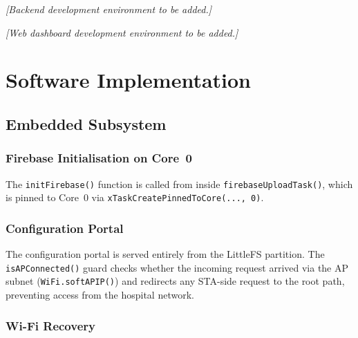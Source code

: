 \begin{center}
	\textit{[Backend development environment to be added.]}
\end{center}

\begin{center}
	\textit{[Web dashboard development environment to be added.]}
\end{center}

\section{Software Implementation}

\subsection{Embedded Subsystem}

\subsubsection{Firebase Initialisation on Core~0}

The \texttt{initFirebase()} function is called from inside
\texttt{firebaseUploadTask()}, which is pinned to Core~0 via
\texttt{xTaskCreatePinnedToCore(..., 0)}.

\subsubsection{Configuration Portal}

The configuration portal is served entirely from the LittleFS partition.
The \texttt{isAPConnected()} guard checks whether the incoming request arrived via
the AP subnet (\texttt{WiFi.softAPIP()}) and redirects any STA-side request to the
root path, preventing access from the hospital network.

\subsubsection{Wi-Fi Recovery}


